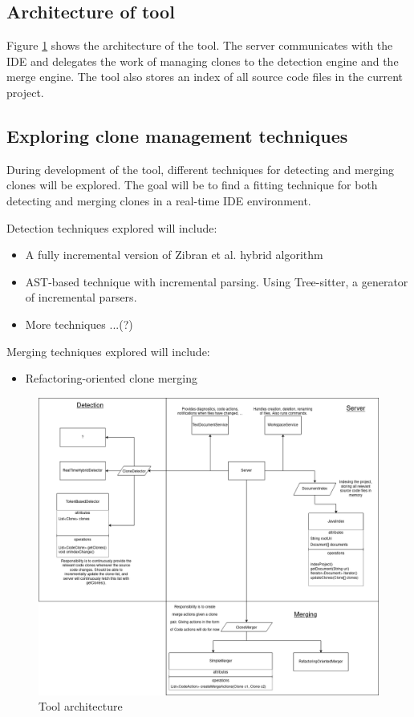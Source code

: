 \documentclass[12pt]{article}
\begin{document}
\subsection{Architecture of tool}

Figure \ref{fig:architecture} shows the architecture of the tool. The server communicates
with the IDE and delegates the work of managing clones to the detection engine and the
merge engine. The tool also stores an index of all source code files in the current project.

\subsection{Exploring clone management techniques}

During development of the tool, different techniques for detecting and merging clones will
be explored. The goal will be to find a fitting technique for both detecting and merging
clones in a real-time IDE environment. 

Detection techniques explored will include:

\begin{itemize}
    \item A fully incremental version of Zibran et al. hybrid
        algorithm\cite{Zibran_real_time_search}
    \item AST-based technique with incremental parsing. Using Tree-sitter, a generator of
        incremental parsers\cite{treesitter}.
    \item More techniques ...(?)
\end{itemize}

Merging techniques explored will include:

\begin{itemize}
    \item Refactoring-oriented clone merging\cite{RefactoringOrientedClonesAndMerging}
\end{itemize}

\begin{figure}
	\includegraphics[width=\textwidth]{images/ToolArchitecture.png}
	\caption{Tool architecture}
	\label{fig:architecture}
\end{figure}
\end{document}
